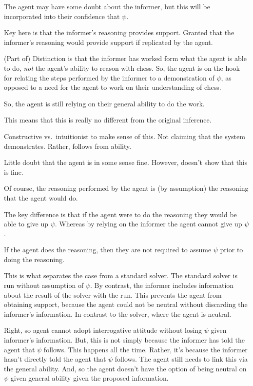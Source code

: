 \documentclass[10pt]{article}
\begin{document}
The agent may have some doubt about the informer, but this will be incorporated into their confidence that \(\psi\).

Key here is that the informer's reasoning provides support.
Granted that the informer's reasoning would provide support if replicated by the agent.

(Part of) Distinction is that the informer has worked form what the agent is able to do, \emph{not} the agent's ability to reason with chess.
So, the agent is on the hook for relating the steps performed by the informer to a demonstration of \(\psi\), as opposed to a need for the agent to work on their understanding of chess.

So, the agent is still relying on their general ability to do the work.

This means that this is really no different from the original inference.


Constructive vs.\ intuitionist to make sense of this.
Not claiming that the system demonstrates.
Rather, follows from ability.

Little doubt that the agent is in some sense fine.
However, doesn't show that this is fine.

Of course, the reasoning performed by the agent is (by assumption) the reasoning that the agent would do.
{
  \color{red}
  The key difference is that if the agent were to do the reasoning they would be able to give up \(\psi\).
  Whereas by relying on the informer the agent cannot give up \(\psi\).

  If the agent does the reasoning, then they are not required to assume \(\psi\) prior to doing the reasoning.
}

This is what separates the case from a standard solver.
The standard solver is run without assumption of \(\psi\).
By contrast, the informer includes information about the result of the solver with the run.
This prevents the agent from obtaining support, because the agent could not be neutral without discarding the informer's information.
In contrast to the solver, where the agent is neutral.

Right, so agent cannot adopt interrogative attitude without losing \(\psi\) given informer's information.
But, this is not simply because the informer has told the agent that \(\psi\) follows.
This happens all the time.
Rather, it's because the informer hasn't directly told the agent that \(\psi\) follows.
The agent still needs to link this via the general ability.
And, so the agent doesn't have the option of being neutral on \(\psi\) given general ability given the proposed information.
\end{document}
